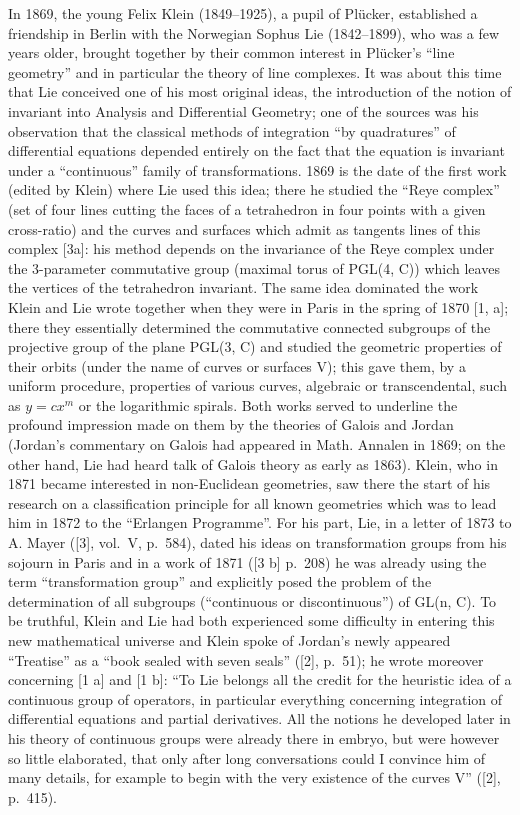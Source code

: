 In 1869, the young Felix Klein (1849--1925), a pupil of Plücker, established a friendship in Berlin with the Norwegian Sophus Lie (1842--1899), who was a few years older, brought together by their common interest in Plücker's ``line geometry'' and in particular the theory of line complexes. It was about this time that Lie conceived one of his most original ideas, the introduction of the notion of invariant into Analysis and Differential Geometry; one of the sources was his observation that the classical methods of integration ``by quadratures'' of differential equations depended entirely on the fact that the equation is invariant under a ``continuous'' family of transformations. 1869 is the date of the first work (edited by Klein) where Lie used this idea; there he studied the ``Reye complex'' (set of four lines cutting the faces of a tetrahedron in four points with a given cross-ratio) and the curves and surfaces which admit as tangents lines of this complex {[}3a{]}: his method depends on the invariance of the Reye complex under the 3-parameter commutative group (maximal torus of PGL(4, C)) which leaves the vertices of the tetrahedron invariant. The same idea dominated the work Klein and Lie wrote together when they were in Paris in the spring of 1870 {[}1, a{]}; there they essentially determined the commutative connected subgroups of the projective group of the plane PGL(3, C) and studied the geometric properties of their orbits (under the name of curves or surfaces V); this gave them, by a uniform procedure, properties of various curves, algebraic or transcendental, such as \(y = cx^m\) or the logarithmic spirals. Both works served to underline the profound impression made on them by the theories of Galois and Jordan (Jordan's commentary on Galois had appeared in Math. Annalen in 1869; on the other hand, Lie had heard talk of Galois theory as early as 1863). Klein, who in 1871 became interested in non-Euclidean geometries, saw there the start of his research on a classification principle for all known geometries which was to lead him in 1872 to the ``Erlangen Programme''. For his part, Lie, in a letter of 1873 to A. Mayer ({[}3{]}, vol.~V, p.~584), dated his ideas on transformation groups from his sojourn in Paris and in a work of 1871 ({[}3 b{]} p.~208) he was already using the term ``transformation group'' and explicitly posed the problem of the determination of all subgroups (``continuous or discontinuous'') of GL(n, C). To be truthful, Klein and Lie had both experienced some difficulty in entering this new mathematical universe and Klein spoke of Jordan's newly appeared ``Treatise'' as a ``book sealed with seven seals'' ({[}2{]}, p.~51); he wrote moreover concerning {[}1 a{]} and {[}1 b{]}: ``To Lie belongs all the credit for the heuristic idea of a continuous group of operators, in particular everything concerning integration of differential equations and partial derivatives. All the notions he developed later in his theory of continuous groups were already there in embryo, but were however so little elaborated, that only after long conversations could I convince him of many details, for example to begin with the very existence of the curves V'' ({[}2{]}, p.~415).

